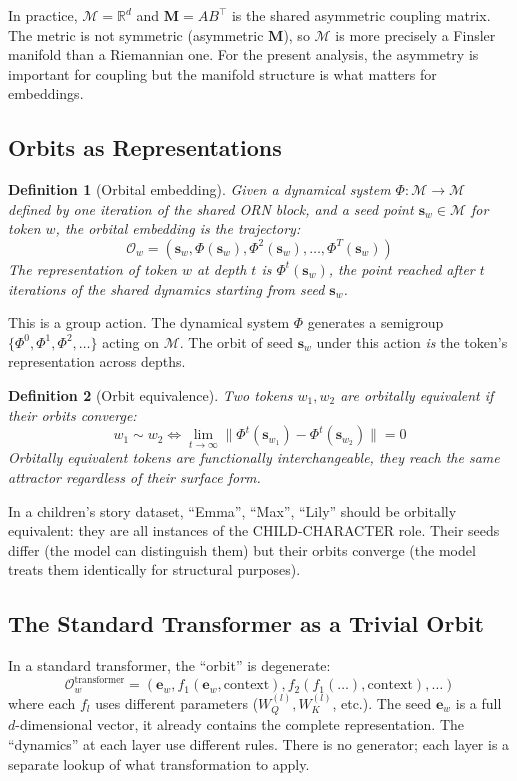 \documentclass[11pt, a4paper]{article}
\newcommand{\M}{\mathbf{M}}
\newcommand{\s}{\mathbf{s}}
\newcommand{\R}{\mathbb{R}}
\newcommand{\calM}{\mathcal{M}}
\newcommand{\calO}{\mathcal{O}}
\newtheorem{definition}{Definition}
\theoremstyle{remark}
\begin{document}
In practice, $\calM = \R^d$ and $\M = AB^\top$ is the shared asymmetric coupling matrix.
The metric is not symmetric (asymmetric $\M$), so $\calM$ is more precisely a Finsler manifold than a Riemannian one.
For the present analysis, the asymmetry is important for coupling but the manifold structure is what matters for embeddings.

\subsection{Orbits as Representations}

\begin{definition}[Orbital embedding]
Given a dynamical system $\Phi: \calM \to \calM$ defined by one iteration of the shared ORN block, and a seed point $\s_w \in \calM$ for token $w$, the orbital embedding is the trajectory:
\[
    \calO_w = (\s_w, \Phi(\s_w), \Phi^2(\s_w), \ldots, \Phi^T(\s_w))
\]
The representation of token $w$ at depth $t$ is $\Phi^t(\s_w)$, the point reached after $t$ iterations of the shared dynamics starting from seed $\s_w$.
\end{definition}

This is a group action.
The dynamical system $\Phi$ generates a semigroup $\{\Phi^0, \Phi^1, \Phi^2, \ldots\}$ acting on $\calM$.
The orbit of seed $\s_w$ under this action \emph{is} the token's representation across depths.

\begin{definition}[Orbit equivalence]
Two tokens $w_1, w_2$ are \emph{orbitally equivalent} if their orbits converge:
\[
    w_1 \sim w_2 \iff \lim_{t \to \infty} \| \Phi^t(\s_{w_1}) - \Phi^t(\s_{w_2}) \| = 0
\]
Orbitally equivalent tokens are functionally interchangeable, they reach the same attractor regardless of their surface form.
\end{definition}

In a children's story dataset, ``Emma'', ``Max'', ``Lily'' should be orbitally equivalent: they are all instances of the CHILD-CHARACTER role.
Their seeds differ (the model can distinguish them) but their orbits converge (the model treats them identically for structural purposes).

\subsection{The Standard Transformer as a Trivial Orbit}

In a standard transformer, the ``orbit'' is degenerate:
\[
    \calO_w^{\text{transformer}} = (\mathbf{e}_w, f_1(\mathbf{e}_w, \text{context}), f_2(f_1(\ldots), \text{context}), \ldots)
\]
where each $f_l$ uses different parameters ($W_Q^{(l)}, W_K^{(l)}$, etc.).
The seed $\mathbf{e}_w$ is a full $d$-dimensional vector, it already contains the complete representation.
The ``dynamics'' at each layer use different rules.
There is no generator; each layer is a separate lookup of what transformation to apply.
\end{document}
